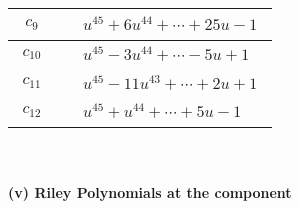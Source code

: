 \documentclass[1p]{elsarticle_modified}
\theoremstyle{definition}
\begin{document}
\begin{tabular}{m{50pt}|m{274pt}}
\hline $$\begin{aligned}c_{9}\end{aligned}$$&$\begin{aligned}
&u^{45}+6 u^{44}+\cdots+25 u-1
\end{aligned}$\\
\hline $$\begin{aligned}c_{10}\end{aligned}$$&$\begin{aligned}
&u^{45}-3 u^{44}+\cdots-5 u+1
\end{aligned}$\\
\hline $$\begin{aligned}c_{11}\end{aligned}$$&$\begin{aligned}
&u^{45}-11 u^{43}+\cdots+2 u+1
\end{aligned}$\\
\hline $$\begin{aligned}c_{12}\end{aligned}$$&$\begin{aligned}
&u^{45}+u^{44}+\cdots+5 u-1
\end{aligned}$\\
\hline
\end{tabular}\\~\\
\newpage\renewcommand{\arraystretch}{1}
\flushleft \textbf{(v) Riley Polynomials at the component}\newline \\
\end{document}
